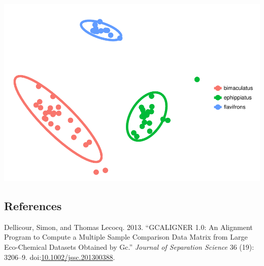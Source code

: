 \documentclass[]{article}
\begin{document}
\includegraphics{Supplementary_1_files/figure-latex/unnamed-chunk-8-1.pdf}

\subsection*{References}\label{references}

\hypertarget{refs}{}
\hypertarget{ref-Dellicour.2013}{}
Dellicour, Simon, and Thomas Lecocq. 2013. ``GCALIGNER 1.0: An Alignment
Program to Compute a Multiple Sample Comparison Data Matrix from Large
Eco-Chemical Datasets Obtained by Gc.'' \emph{Journal of Separation
Science} 36 (19): 3206--9.
doi:\href{https://doi.org/10.1002/jssc.201300388}{10.1002/jssc.201300388}.
\end{document}
